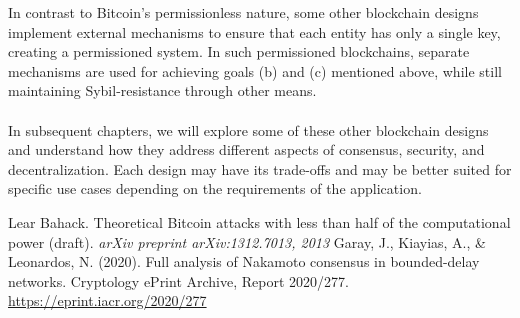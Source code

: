In contrast to Bitcoin's permissionless nature, some other blockchain designs implement external mechanisms to ensure that each entity has only a single key, creating a permissioned system. In such permissioned blockchains, separate mechanisms are used for achieving goals (b) and (c) mentioned above, while still maintaining Sybil-resistance through other means.\\\\
In subsequent chapters, we will explore some of these other blockchain designs and understand how they address different aspects of consensus, security, and decentralization. Each design may have its trade-offs and may be better suited for specific use cases depending on the requirements of the application.

\renewcommand{\bibname}{References}
\begin{thebibliography}{9}
     Lear Bahack. Theoretical Bitcoin attacks with less than half of the computational power (draft). \textit{arXiv preprint arXiv:1312.7013, 2013}
     Garay, J., Kiayias, A., \& Leonardos, N. (2020). Full analysis of Nakamoto consensus in bounded-delay networks. Cryptology ePrint Archive, Report 2020/277. \url{https://eprint.iacr.org/2020/277}
\end{thebibliography}